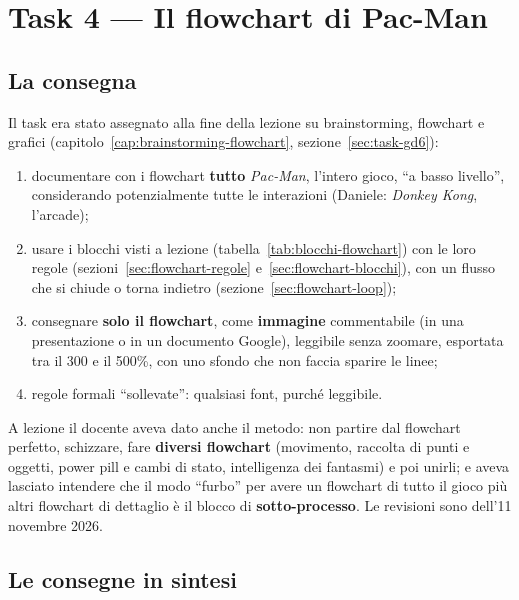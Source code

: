 \section{Task 4 --- Il flowchart di Pac-Man}
\label{rv:t4:sec:task}

\subsection{La consegna}

Il task era stato assegnato alla fine della lezione su brainstorming,
flowchart e grafici (capitolo~\ref{cap:brainstorming-flowchart},
sezione~\ref{sec:task-gd6}):
\begin{enumerate}
  \item documentare con i flowchart \textbf{tutto} \emph{Pac-Man}, l'intero
        gioco, ``a basso livello'', considerando potenzialmente tutte le
        interazioni (Daniele: \emph{Donkey Kong}, l'arcade);
  \item usare i blocchi visti a lezione (tabella~\ref{tab:blocchi-flowchart})
        con le loro regole (sezioni~\ref{sec:flowchart-regole}
        e~\ref{sec:flowchart-blocchi}), con un flusso che si chiude o torna
        indietro (sezione~\ref{sec:flowchart-loop});
  \item consegnare \textbf{solo il flowchart}, come \textbf{immagine}
        commentabile (in una presentazione o in un documento Google),
        leggibile senza zoomare, esportata tra il 300 e il 500\%, con uno
        sfondo che non faccia sparire le linee;
  \item regole formali ``sollevate'': qualsiasi font, purché leggibile.
\end{enumerate}
A lezione il docente aveva dato anche il metodo: non partire dal flowchart
perfetto, schizzare, fare \textbf{diversi flowchart} (movimento, raccolta di
punti e oggetti, power pill e cambi di stato, intelligenza dei fantasmi) e poi
unirli; e aveva lasciato intendere che il modo ``furbo'' per avere un
flowchart di tutto il gioco più altri flowchart di dettaglio è il blocco di
\textbf{sotto-processo}. Le revisioni sono dell'11 novembre 2026.

\subsection{Le consegne in sintesi}


